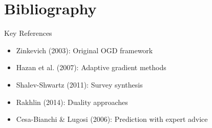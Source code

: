 \documentclass{beamer}
\begin{document}
\section{Bibliography}
\begin{frame}{Key References}
\begin{itemize}
\item Zinkevich (2003): Original OGD framework
\item Hazan et al. (2007): Adaptive gradient methods
\item Shalev-Shwartz (2011): Survey synthesis
\item Rakhlin (2014): Duality approaches
\item Cesa-Bianchi \& Lugosi (2006): Prediction with expert advice
\end{itemize}
\end{frame}
\end{document}

